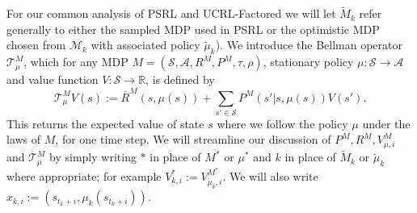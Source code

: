 \documentclass{article}
\newtheorem{lemma}{Lemma}
\newcommand{\Exp}{\mathds{E}}
\newcommand{\Sc}{\mathcal{S}}
\newcommand{\Ac}{\mathcal{A}}
\newcommand{\Mc}{\mathcal{M}}
\newcommand{\Tc}{\mathcal{T}}
\begin{document}


For our common analysis of PSRL and UCRL-Factored we will let $\tilde{M}_k$ refer generally to either the sampled MDP used in PSRL or the optimistic MDP chosen from $\Mc_k$ with associated policy $\tilde{\mu}_k$).
We introduce the Bellman operator $\mathcal{T}_{\mu}^{M}$, which for any MDP $M = (\Sc, \Ac, R^M, P^M, \tau, \rho)$, stationary policy $\mu:\Sc \rightarrow \Ac$ and value function $V:\Sc \rightarrow \mathds{R}$, is defined by
$$\mathcal{T}_{\mu}^{M} V(s) := \overline{R}^{M} (s, \mu(s)) + \sum_{s' \in \Sc} P^{M}(s' | s, \mu(s)) V(s').$$
This returns the expected value of state $s$ where we follow the policy $\mu$ under the laws of $M$, for one time step.
We will streamline our discussion of $P^{M}, R^{M}, V^{M}_{\mu,i}$ and $\Tc^M_\mu$ by simply writing $*$ in place of $M^*$ or $\mu^*$ and $k$ in place of $\tilde{M}_k$ or $\tilde{\mu}_k$ where appropriate; for example $V^*_{k,i} := V^{M^*}_{\tilde{\mu}_k,i}$. We will also write $x_{k,i} := \left(s_{t_k+i}, \mu_k(s_{t_k+i})\right)$.
\end{document}
